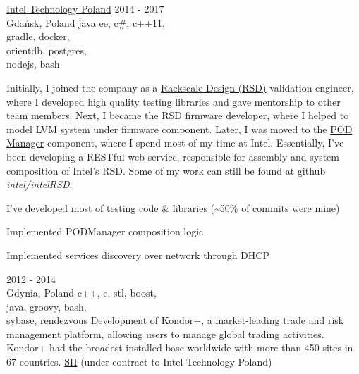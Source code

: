 \documentclass[a4paper,11pt]{cv4tw}%
\begin{document}
      {\href{https://www.intel.com/content/www/us/en/jobs/locations/poland.html}
        {Intel Technology Poland}}
      {2014 - 2017\\Gdańsk, Poland}
      {java ee, c\#, c++11,\\gradle, docker,\\orientdb, postgres,\\nodejs, bash}
      {Initially, I joined the company as a \href{https://www.intel.com/intelRSD}{Rackscale Design (RSD)} validation engineer, where
        I developed high quality testing libraries and gave mentorship to other team members. Next, I became the RSD firmware developer,
        where I helped to model LVM system under firmware component. Later, I was moved to the
        \href{https://www.intel.com/content/www/us/en/architecture-and-technology/rack-scale-design/pod-manager-user-guide-v2-1.html}{POD Manager} component,
        where I spend most of my time at Intel. Essentially, I've been developing a RESTful web service, responsible
        for assembly and system composition of Intel's RSD. Some of my work can still be found at github
        \emph{\href{https://github.com/intel/intelRSD}{intel/intelRSD}}.
        \begin{missions}
        \item I've developed most of testing code \& libraries (\textasciitilde50\% of commits were mine)
        \item Implemented PODManager composition logic
        \item Implemented services discovery over network through DHCP
        \end{missions}
      }      
      {2012 - 2014\\Gdynia, Poland}
      {c++, c, stl, boost,\\java, groovy, bash,\\sybase, rendezvous}
      {Development of Kondor+, a market-leading trade and risk management platform,
        allowing users to manage global trading activities. Kondor+ had the broadest
        installed base worldwide with more than 450 sites in 67 countries.
      }
      {\href{https://sii.pl/en/}{SII} (under contract to Intel Technology Poland)}
\end{document}
